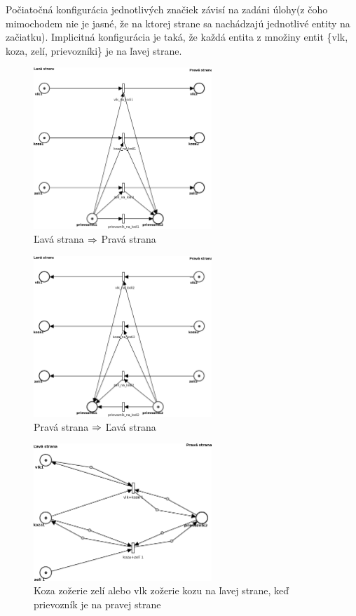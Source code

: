 \documentclass[11pt,a4paper]{article}
\begin{document}
Počiatočná konfigurácia jednotlivých značiek závisí na zadáni úlohy(z čoho mimochodem nie je jasné, že na ktorej strane sa nachádzajú jednotlivé entity na začiatku). Implicitná konfigurácia je taká, že každá entita z množiny entit \{vlk, koza, zelí, prievozníki\} je na ľavej strane.

\begin{figure}[H]
    \centering
	\includegraphics[width=0.6\textwidth]{pn1NEW.eps}
    \caption{Ľavá strana $\protect\Rightarrow$ Pravá strana}
    \label{fig:pn1}
\end{figure}

\begin{figure}[H]
    \centering
	\includegraphics[width=0.6\textwidth]{pn2NEW.eps}
    \caption{Pravá strana $\protect\Rightarrow$ Ľavá strana}
    \label{fig:pn2}
\end{figure}

\begin{figure}[H]
    \centering
	\includegraphics[width=0.6\textwidth]{pn3NEW.eps}
    \caption{Koza zožerie zelí alebo vlk zožerie kozu na ľavej strane, keď prievozník je na pravej strane}
    \label{fig:pn3}
\end{figure}
\end{document}
